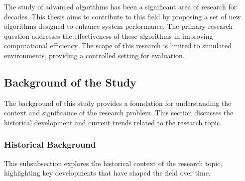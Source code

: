 \begin{spacing}{2}  %

The study of advanced algorithms has been a significant area of research for decades. This thesis aims to contribute to this field by proposing a set of new algorithms designed to enhance system performance. The primary research question addresses the effectiveness of these algorithms in improving computational efficiency. The scope of this research is limited to simulated environments, providing a controlled setting for evaluation.

\subsection{Background of the Study}
The background of this study provides a foundation for understanding the context and significance of the research problem. This section discusses the historical development and current trends related to the research topic.
\subsubsection{Historical Background}
This subsubsection explores the historical context of the research topic, highlighting key developments that have shaped the field over time.


\end{spacing}
